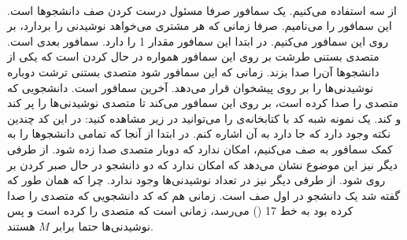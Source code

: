 \\\noindent
از سه
استفاده می‌کنیم. یک سمافور صرفا مسئول درست کردن صف دانشجوها است. این سمافور را
\linebreak
{}
می‌نامیم. صرفا زمانی که هر مشتری می‌خواهد نوشیدنی را بردارد، بر روی این سمافور
می‌کنیم. در ابتدا این سمافور مقدار 1 را دارد. سمافور بعدی
است. متصدی بستنی طرشت بر روی این سمافور همواره در حال
کردن است که یکی از دانشجو‌ها آن‌را صدا بزند. زمانی که این سمافور
شود متصدی بستنی ترشت دوباره نوشیدنی‌ها را بر روی پیشخوان قرار می‌دهد.
آخرین سمافور
است. دانشجویی که متصدی را صدا کرده است، بر روی این سمافور
می‌کند تا متصدی نوشیدنی‌ها را پر کند و
کند. یک نمونه شبه کد با کتابخانه‌ی
را می‌توانید در زیر مشاهده کنید:
\noindent
در این کد چندین نکته وجود دارد که جا دارد به آن اشاره کنم.
در ابتدا از آنجا که تمامی دانشجو‌ها را به کمک سمافور
\linebreak
{}
به صف می‌کنیم، امکان ندارد که دوبار متصدی صدا زده شود. از طرفی دیگر نیز این موضوع نشان می‌دهد که
امکان ندارد که دو دانشجو در حال صبر کردن بر روی
شود. از طرفی دیگر نیز در تعداد نوشیدنی‌ها
وجود ندارد. چرا که همان طور که گفته شد یک دانشجو در اول صف است. زمانی هم که کد دانشجویی
که متصدی را صدا کرده بود به خط
17
()
می‌رسد، زمانی است که متصدی 
را
کرده است و پس نوشیدنی‌ها حتما برابر
$M$
هستند.




